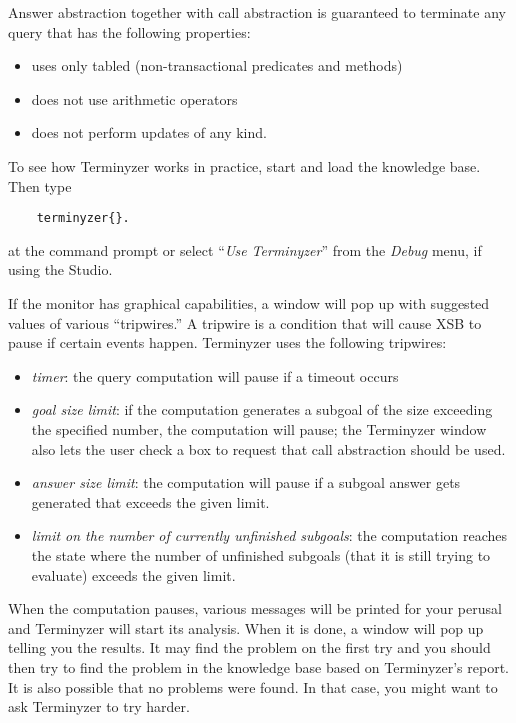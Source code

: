 Answer abstraction together with call abstraction is guaranteed to
terminate any query that has the following properties:
\begin{itemize}
\item  uses only tabled (non-transactional predicates and methods)
\item  does not use arithmetic operators
\item  does not perform updates of any kind.
\end{itemize}

To see how Terminyzer works in practice, start \ERGO and load the knowledge
base. Then type
\begin{verbatim}
    terminyzer{}.
\end{verbatim}
at the command prompt or select ``\emph{Use Terminyzer}'' 
from the \emph{Debug} menu, if using the Studio. 

If the monitor has graphical capabilities,
a window will pop up with suggested values of various ``tripwires.''
A tripwire is a condition that will cause XSB to pause if certain events happen.
Terminyzer uses the following tripwires:
\begin{itemize}
\item  \emph{timer}: the query computation will pause if a timeout occurs
\item  \emph{goal size limit}: if the computation generates a subgoal of
  the size exceeding the specified  number, the computation will pause;
  the Terminyzer window also lets the user check a box to request that call
  abstraction should be used.
\item  \emph{answer size limit}: the computation will pause if a subgoal
  answer gets generated that exceeds the given limit.
\item  \emph{limit on the number of currently unfinished subgoals}:
  the computation reaches the state where the number of unfinished subgoals
  (that it is still trying to evaluate) exceeds the given limit.
\end{itemize}
When the computation pauses, various messages will be printed for your
perusal and Terminyzer will start its analysis. When it is done, a window
will pop up telling you the results. It may find the problem on the first try
and you should then try to find the problem in the knowledge base based on
Terminyzer's report.  It is also possible that no problems were found.
In that case, you might want to ask Terminyzer to try harder.

